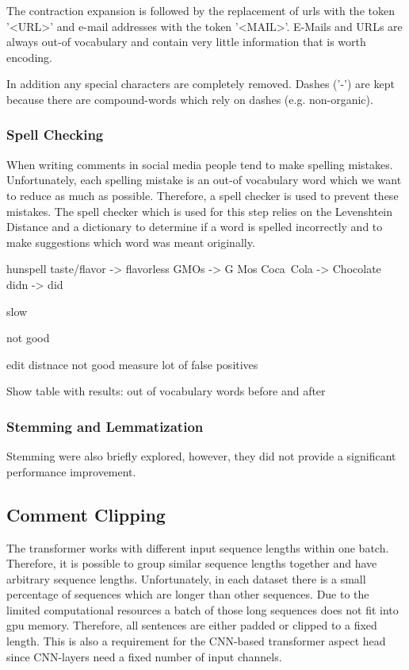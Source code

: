 
The contraction expansion is followed by the replacement of \glspl{url} with the token '<URL>' and e-mail addresses with the token '<MAIL>'. E-Mails and URLs are always out-of vocabulary and contain very little information that is worth encoding. 


In addition any special characters are completely removed. Dashes ('-') are kept because there are compound-words which rely on dashes (e.g. non-organic).

\subsubsection*{Spell Checking}
When writing comments in social media people tend to make spelling mistakes. Unfortunately, each spelling mistake is an out-of vocabulary word which we want to reduce as much as possible.
Therefore, a spell checker is used to prevent these mistakes. The spell checker which is used for this step relies on the Levenshtein Distance \cite{Levenshtein1966} and a dictionary to determine if a word is spelled incorrectly and to make suggestions which word was meant originally. 

hunspell taste/flavor -> flavorless
GMOs -> G Mos
Coca~Cola -> Chocolate
didn -> did

slow

not good

edit distnace not good measure
lot of false positives


Show table with results: out of vocabulary words before and after

\subsubsection*{Stemming and Lemmatization}

Stemming were also briefly explored, however, they did not provide a significant performance improvement.

\subsection{Comment Clipping}


The transformer works with different input sequence lengths within one batch. Therefore, it is possible to group similar sequence lengths together and have arbitrary sequence lengths. Unfortunately, in each dataset there is a small percentage of sequences which are longer than other sequences. Due to the limited computational resources a batch of those long sequences  does not fit into \gls{gpu} memory. Therefore, all sentences are either padded or clipped to a fixed length. This is also a requirement for the CNN-based transformer aspect head since CNN-layers need a fixed number of input channels.

